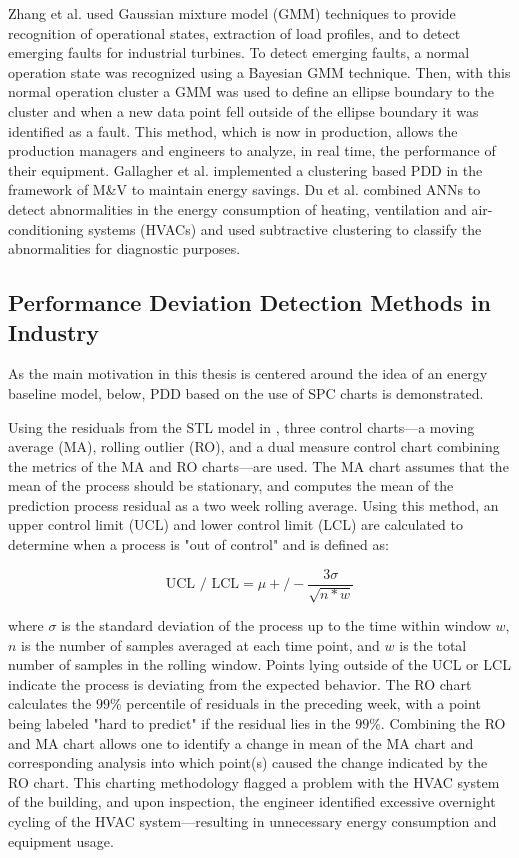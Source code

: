 Zhang et al. \cite{gas-turbine-faults} used Gaussian mixture model (GMM) techniques to provide recognition of operational states, extraction of load profiles, and to detect emerging faults for industrial turbines. To detect emerging faults, a normal operation state was recognized using a Bayesian GMM technique. Then, with this normal operation cluster a GMM was used to define an ellipse boundary to the cluster and when a new data point fell outside of the ellipse boundary it was identified as a fault. This method, which is now in production, allows the production managers and engineers to analyze, in real time, the performance of their equipment. Gallagher et al. \cite{intelliMAV} implemented a clustering based PDD in the framework of M&V to maintain energy savings. Du et al. \cite{fault-HVAC} combined ANNs to detect abnormalities in the energy consumption of heating, ventilation and air-conditioning systems (HVACs) and used subtractive clustering to classify the abnormalities for diagnostic purposes.

\subsection{Performance Deviation Detection Methods in Industry}

As the main motivation in this thesis is centered around the idea of an energy baseline model, below, PDD based on the use of SPC charts is demonstrated.

Using the residuals from the STL model in \cite{tightening}, three control charts—a moving average (MA), rolling outlier (RO), and a dual measure control chart combining the metrics of the MA and RO charts—are used. The MA chart assumes that the mean of the process should be stationary, and computes the mean of the prediction process residual as a two week rolling average. Using this method, an upper control limit (UCL) and lower control limit (LCL) are calculated to determine when a process is "out of control" and is defined as:

$$\text{UCL / LCL} = \mu +/- \frac{3\sigma}{\sqrt{n * w}}$$

where $\sigma$ is the standard deviation of the process up to the time within window $w$, $n$ is the number of samples averaged at each time point, and $w$ is the total number of samples in the rolling window. Points lying outside of the UCL or LCL indicate the process is deviating from the expected behavior. The RO chart calculates the $99\%$ percentile of residuals in the preceding week, with a point being labeled "hard to predict" if the residual lies in the $99\%$. Combining the RO and MA chart allows one to identify a change in mean of the MA chart and corresponding analysis into which point(s) caused the change indicated by the RO chart. This charting methodology flagged a problem with the HVAC system of the building, and upon inspection, the engineer identified excessive overnight cycling of the HVAC system—resulting in unnecessary energy consumption and equipment usage. 

